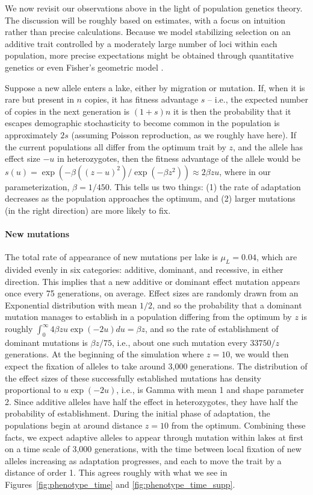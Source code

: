 \documentclass{article}
\begin{document}
We now revisit our observations above in the light of population genetics theory. The discussion will be roughly based on estimates, with a focus on intuition rather than precise calculations. Because we model stabilizing selection on an additive trait controlled by a moderately large number of loci within each population, more precise expectations might be obtained through quantitative genetics \citep{svardal2014general} or even Fisher's geometric model \citep{barton2001hybridization,chevin2014niche}.

Suppose a new allele enters a lake, either by migration or mutation. If, when it is rare but present in $n$ copies, it has fitness advantage $s$ -- i.e., the expected number of copies in the next generation is $(1+s)n$ it is then the probability that it escapes demographic stochasticity to become common in the population is approximately $2s$ \citep{lambert2006probability,haldane1927mathematical} (assuming Poisson reproduction, as we roughly have here). If the current populations all differ from the optimum trait by $z$, and the allele has effect size $-u$ in heterozygotes,  then the fitness advantage of the allele would be $s(u) = \exp(-\beta((z - u)^2) / \exp( - \beta z^2)) \approx 2 \beta z u$, where in our parameterization, $\beta = 1 / 450$. This tells us two things: (1) the rate of adaptation decreases as the population approaches the optimum, and (2) larger mutations (in the right direction) are more likely to fix.

\paragraph{New mutations}

The total rate of appearance of new mutations per lake is $\mu_L = 0.04$, which are divided evenly in six categories: additive, dominant, and recessive, in either direction. This implies that a new additive or dominant effect mutation appears once every 75 generations, on average. Effect sizes are randomly drawn from an Exponential distribution with mean $1/2$, 
and so the probability that a dominant mutation manages to establish in a population differing from the optimum by $z$ is roughly $\int_0^\infty 4 \beta z u \exp(-2u) du = \beta z$, 
and so the rate of establishment of dominant mutations is $\beta z / 75$, i.e., about one such mutation every $33750/z$ generations. At the beginning of the simulation where $z = 10$, we would then expect the fixation of alleles to take around 3,000 generations. The distribution of the effect sizes of these successfully established mutations 
has density proportional to $u \exp(-2u)$, i.e., is Gamma with mean 1 and shape parameter 2. Since additive alleles have half the effect in heterozygotes, they have half the probability of establishment. During the initial phase of adaptation, the populations begin at around distance $z=10$ from the optimum. Combining these facts, we expect adaptive alleles to appear through mutation within lakes at first on a time scale of 3,000 generations, with the time between local fixation of new alleles increasing as adaptation progresses, and each to move the trait by a distance of order 1. This agrees roughly with what we see in Figures~\ref{fig:phenotype_time} and \ref{fig:phenotype_time_supp}.
\end{document}
